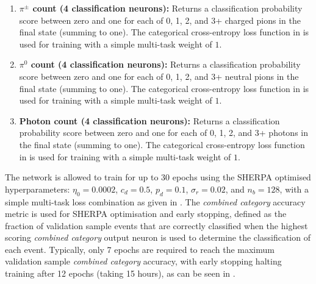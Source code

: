 \begin{enumerate}
          (summing to one). The categorical cross-entropy loss function in
           is used for training with a simple multi-task
          weight of $1$.
    \item \textbf{$\pi^{\pm}$ count (4 classification neurons):} Returns a classification
          probability score between zero and one for each of 0, 1, 2, and 3+ charged pions in the
          final state (summing to one). The categorical cross-entropy loss function in
           is used for training with a simple multi-task
          weight of $1$.
    \item \textbf{$\pi^{0}$ count (4 classification neurons):} Returns a classification
          probability score between zero and one for each of 0, 1, 2, and 3+ neutral pions in the
          final state (summing to one). The categorical cross-entropy loss function in
           is used for training with a simple multi-task
          weight of $1$.
    \item \textbf{Photon count (4 classification neurons):} Returns a classification probability
          score between zero and one for each of 0, 1, 2, and 3+ photons in the final state
          (summing to one). The categorical cross-entropy loss function in
           is used for training with a simple multi-task
          weight of $1$.
\end{enumerate}

The network is allowed to train for up to 30 epochs using the SHERPA optimised hyperparameters:
$\eta_{0}=0.0002$, $c_{d}=0.5$, $p_{d}=0.1$, $\sigma_{r}=0.02$, and $n_{b}=128$, with a simple
multi-task loss combination as given in . The \emph{combined
category} accuracy metric is used for SHERPA optimisation and early stopping, defined as the
fraction of validation sample events that are correctly classified when the highest scoring
\emph{combined category} output neuron is used to determine the classification of each event.
Typically, only 7 epochs are required to reach the maximum validation sample \emph{combined
category} accuracy, with early stopping halting training after 12 epochs (taking 15 hours), as can
be seen in .

